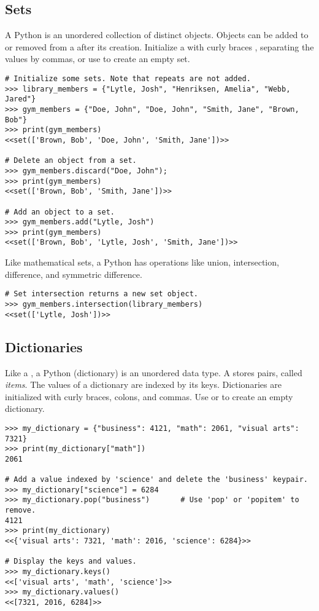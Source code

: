 
\subsection*{Sets}
A Python  is an unordered collection of distinct objects.
Objects can be added to or removed from a  after its creation.
Initialize a  with curly braces \li{\{ \}}, separating the values by commas, or use  to create an empty set.
\begin{lstlisting}
# Initialize some sets. Note that repeats are not added.
>>> library_members = {"Lytle, Josh", "Henriksen, Amelia", "Webb, Jared"}
>>> gym_members = {"Doe, John", "Doe, John", "Smith, Jane", "Brown, Bob"}
>>> print(gym_members)
<<set(['Brown, Bob', 'Doe, John', 'Smith, Jane'])>>

# Delete an object from a set.
>>> gym_members.discard("Doe, John");
>>> print(gym_members)
<<set(['Brown, Bob', 'Smith, Jane'])>>

# Add an object to a set.
>>> gym_members.add("Lytle, Josh")
>>> print(gym_members)
<<set(['Brown, Bob', 'Lytle, Josh', 'Smith, Jane'])>>
\end{lstlisting}

Like mathematical sets, a Python  has operations like union, intersection, 
difference, and symmetric difference.
\begin{lstlisting}
# Set intersection returns a new set object.
>>> gym_members.intersection(library_members)
<<set(['Lytle, Josh'])>>
\end{lstlisting}


\subsection*{Dictionaries}
Like a , a Python  (dictionary) is an unordered data type.
A  stores  pairs, called \emph{items}.
The values of a dictionary are indexed by its keys.
Dictionaries are initialized with curly braces, colons, and commas.
Use  or \li{\{\}} to create an empty dictionary.
\begin{lstlisting}
>>> my_dictionary = {"business": 4121, "math": 2061, "visual arts": 7321} 
>>> print(my_dictionary["math"])
2061

# Add a value indexed by 'science' and delete the 'business' keypair.
>>> my_dictionary["science"] = 6284
>>> my_dictionary.pop("business")       # Use 'pop' or 'popitem' to remove.
4121
>>> print(my_dictionary)
<<{'visual arts': 7321, 'math': 2016, 'science': 6284}>>

# Display the keys and values.
>>> my_dictionary.keys()
<<['visual arts', 'math', 'science']>>
>>> my_dictionary.values()
<<[7321, 2016, 6284]>>
\end{lstlisting}

